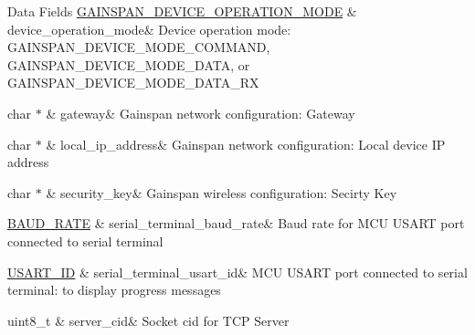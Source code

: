 \begin{DoxyFields}{Data Fields}
\hyperlink{group__wireless__interface_gab3f544ed880ca96513a544cc83b36dc1}{G\+A\+I\+N\+S\+P\+A\+N\+\_\+\+D\+E\+V\+I\+C\+E\+\_\+\+O\+P\+E\+R\+A\+T\+I\+O\+N\+\_\+\+M\+O\+DE}\hypertarget{group__wireless__interface_a6259895b4321b8e0830693e74ced0516}{}\label{group__wireless__interface_a6259895b4321b8e0830693e74ced0516}
&
device\+\_\+operation\+\_\+mode&
Device operation mode\+: G\+A\+I\+N\+S\+P\+A\+N\+\_\+\+D\+E\+V\+I\+C\+E\+\_\+\+M\+O\+D\+E\+\_\+\+C\+O\+M\+M\+A\+ND, G\+A\+I\+N\+S\+P\+A\+N\+\_\+\+D\+E\+V\+I\+C\+E\+\_\+\+M\+O\+D\+E\+\_\+\+D\+A\+TA, or G\+A\+I\+N\+S\+P\+A\+N\+\_\+\+D\+E\+V\+I\+C\+E\+\_\+\+M\+O\+D\+E\+\_\+\+D\+A\+T\+A\+\_\+\+RX \\
\hline

char $\ast$\hypertarget{group__wireless__interface_a213e6089050a11275f92862835df32e9}{}\label{group__wireless__interface_a213e6089050a11275f92862835df32e9}
&
gateway&
Gainspan network configuration\+: Gateway \\
\hline

char $\ast$\hypertarget{group__wireless__interface_ab62e24460e47b27c59877eb05d851e80}{}\label{group__wireless__interface_ab62e24460e47b27c59877eb05d851e80}
&
local\+\_\+ip\+\_\+address&
Gainspan network configuration\+: Local device IP address \\
\hline

char $\ast$\hypertarget{group__wireless__interface_afa83ceb5bf6390108193397bd1be2cb4}{}\label{group__wireless__interface_afa83ceb5bf6390108193397bd1be2cb4}
&
security\+\_\+key&
Gainspan wireless configuration\+: Secirty Key \\
\hline

\hyperlink{group__wireless__interface_gafd83f18bb43add6a2eaf3228fec2fed7}{B\+A\+U\+D\+\_\+\+R\+A\+TE}\hypertarget{group__wireless__interface_ad60a1ff0889d58095a7880b991c81c58}{}\label{group__wireless__interface_ad60a1ff0889d58095a7880b991c81c58}
&
serial\+\_\+terminal\+\_\+baud\+\_\+rate&
Baud rate for M\+CU U\+S\+A\+RT port connected to serial terminal \\
\hline

\hyperlink{group__usart_async_module_gaae3c5ea77a411e5f40e4377f77067b86}{U\+S\+A\+R\+T\+\_\+\+ID}\hypertarget{group__wireless__interface_a1500930252864c9e95daa276326ed8bc}{}\label{group__wireless__interface_a1500930252864c9e95daa276326ed8bc}
&
serial\+\_\+terminal\+\_\+usart\+\_\+id&
M\+CU U\+S\+A\+RT port connected to serial terminal\+: to display progress messages \\
\hline

uint8\+\_\+t\hypertarget{group__wireless__interface_ab72c46014df7b26e99fcb9b6b7fdd175}{}\label{group__wireless__interface_ab72c46014df7b26e99fcb9b6b7fdd175}
&
server\+\_\+cid&
Socket cid for T\+CP Server \\
\hline


\end{DoxyFields}
